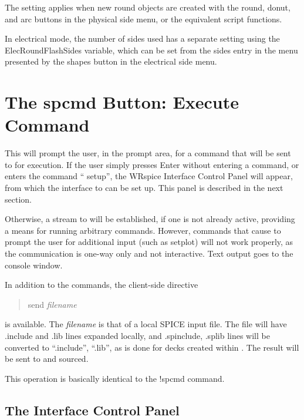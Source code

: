 The setting applies when new round objects are created with the {\cb
round}, {\cb donut}, and {\cb arc} buttons in the physical side menu,
or the equivalent script functions. 

In electrical mode, the number of sides used has a separate setting
using the {\et ElecRoundFlashSides} variable, which can be set from
the {\cb sides} entry in the menu presented by the {\cb shapes} button
in the electrical side menu.


\section{The {\cb spcmd} Button: Execute {\WRspice} Command}

This will prompt the user, in the prompt area, for a command that will
be sent to {\WRspice} for execution.  If the user simply presses {\kb
Enter} without entering a command, or enters the command ``{\vt
setup}'', the {\cb WRspice Interface Control Panel} will appear, from
which the interface to {\WRspice} can be set up.  This panel is
described in the next section.

Otherwise, a stream to {\WRspice} will be established, if one is not
already active, providing a means for running arbitrary {\WRspice}
commands.  However, commands that cause {\WRspice} to prompt the user
for additional input (such as {\vt setplot}) will not work properly,
as the communication is one-way only and not interactive.  Text output
goes to the console window.

In addition to the {\WRspice} commands, the client-side directive
\begin{quote}
{\vt send} {\it filename}
\end{quote}
is available.  The {\it filename} is that of a local SPICE input file. 
The file will have {\vt .include} and {\vt .lib} lines expanded
locally, and {\vt .spinclude}, {\vt .splib} lines will be converted to
``{\vt .include}'', ``{\vt .lib}'', as is done for decks created within
{\Xic}.  The result will be sent to {\WRspice} and sourced.

This operation is basically identical to the {\cb !spcmd} command.

\subsection{The {\WRspice} Interface Control Panel}

